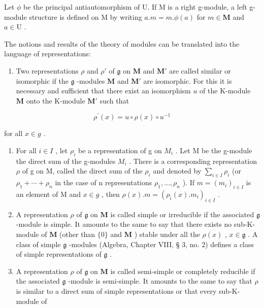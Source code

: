 Let \(\phi\) be the principal antiautomorphism of U. If M is a right g-module, a left g-module structure is defined on M by writing \(a.m = m.\phi (a)\) for \(m\in \mathbf{M}\) and \(a\in \mathrm{U}\) .

The notions and results of the theory of modules can be translated into the language of representations:

\begin{enumerate}
\def\labelenumi{(\arabic{enumi})}
\tightlist
\item
  Two representations \(\rho\) and \(\rho'\) of \(\mathfrak{g}\) on \(\mathbf{M}\) and \(\mathbf{M}'\) are called similar or isomorphic if the \(\mathfrak{g}\) -modules \(\mathbf{M}\) and \(\mathbf{M}'\) are isomorphic. For this it is necessary and sufficient that there exist an isomorphism \(u\) of the K-module \(\mathbf{M}\) onto the K-module \(\mathbf{M}'\) such that
\end{enumerate}

\[
\rho^ {\prime} (x) = u \circ \rho (x) \circ u ^ {- 1}
\]

for all \(x \in g\) .

\begin{enumerate}
\def\labelenumi{(\arabic{enumi})}
\setcounter{enumi}{1}
\item
  For all \(i \in I\) , let \(\rho_{i}\) be a representation of g on \(M_{i}\) . Let M be the g-module the direct sum of the g-modules \(M_{i}\) . There is a corresponding representation \(\rho\) of g on M, called the direct sum of the \(\rho_{i}\) and denoted by \(\sum_{i\in I}\rho_{i}\) (or \(\rho_{1} + \cdots + \rho_{n}\) in the case of n representations \(\rho_{1}, \ldots, \rho_{n}\) ). If \(m = (m_{i})_{i \in I}\) is an element of M and \(x \in g\) , then \(\rho(x).m = (\rho_{i}(x).m_{i})_{i \in I}\) .
\item
  A representation \(\rho\) of \(\mathfrak{g}\) on \(\mathbf{M}\) is called simple or irreducible if the associated \(\mathfrak{g}\) -module is simple. It amounts to the same to say that there exists no sub-K-module of \(\mathbf{M}\) (other than \(\{0\}\) and \(\mathbf{M}\) ) stable under all the \(\rho(x)\) , \(x \in \mathfrak{g}\) . A class of simple \(\mathfrak{g}\) -modules (Algebra, Chapter VIII, § 3, no. 2) defines a class of simple representations of \(\mathfrak{g}\) .
\item
  A representation \(\rho\) of \(\mathfrak{g}\) on \(\mathbf{M}\) is called semi-simple or completely reducible if the associated \(\mathfrak{g}\) -module is semi-simple. It amounts to the same to say that \(\rho\) is similar to a direct sum of simple representations or that every sub-K-module of
\end{enumerate}

